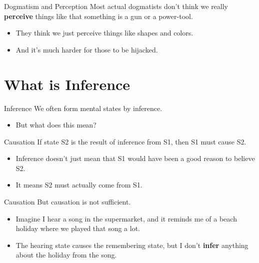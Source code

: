 \documentclass[
  17pt,
  letterpaper,
  ignorenonframetext,
  aspectratio=169,
  handout,
  xcolor={dvipsnames}]{beamer}
\providecommand{\tightlist}{%
  \setlength{\itemsep}{0pt}\setlength{\parskip}{0pt}}\usepackage{longtable,booktabs,array}
\begin{document}
\begin{frame}{Dogmatism and Perception}
\protect\hypertarget{dogmatism-and-perception}{}
Most actual dogmatists don't think we really \textbf{perceive} things
like that something is a gun or a power-tool.

\begin{itemize}[<+->]
\tightlist
\item
  They think we just perceive things like shapes and colors.
\item
  And it's much harder for those to be hijacked.
\end{itemize}
\end{frame}

\hypertarget{what-is-inference}{%
\section{What is Inference}\label{what-is-inference}}

\begin{frame}{Inference}
\protect\hypertarget{inference}{}
We often form mental states by inference.

\begin{itemize}[<+->]
\tightlist
\item
  But what does this mean?
\end{itemize}
\end{frame}

\begin{frame}{Causation}
\protect\hypertarget{causation}{}
If state S2 is the result of inference from S1, then S1 must cause S2.

\begin{itemize}[<+->]
\tightlist
\item
  Inference doesn't just mean that S1 would have been a good reason to
  believe S2.
\item
  It means S2 must actually come from S1.
\end{itemize}
\end{frame}

\begin{frame}{Causation}
\protect\hypertarget{causation-1}{}
But causation is not sufficient.

\begin{itemize}[<+->]
\tightlist
\item
  Imagine I hear a song in the supermarket, and it reminds me of a beach
  holiday where we played that song a lot.
\item
  The hearing state causes the remembering state, but I don't
  \textbf{infer} anything about the holiday from the song.
\end{itemize}
\end{frame}
\end{document}
